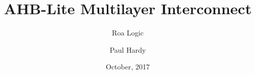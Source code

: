 \usepackage{pkg/roalogictitle}


\title{AHB-Lite Multilayer Interconnect}
\author{Roa Logic}
\date{October, 2017}
\author{Paul Hardy}

\pagestyle{fancy}
\fancyhf{}
\fancyhead[L]{\thepage}
